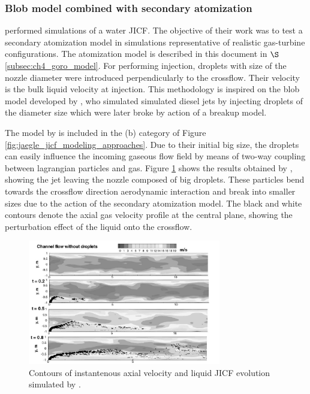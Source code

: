 \newpage

\subsubsection*{Blob model combined with secondary atomization }

 performed simulations of a water JICF. The objective of their work was to test a secondary atomization model in simulations representative of realistic gas-turbine configurations. The atomization model is described in this document in $\S$\ref{subsec:ch4_goro_model}. For performing injection, droplets with size of the nozzle diameter were introduced perpendicularly to the crossflow. Their velocity is the bulk liquid velocity at injection. This methodology is inspired on the blob model developed by , who simulated simulated diesel jets by injecting droplets of the diameter size which were later broke by action of a breakup model. 

The model by  is included in the (b) category of Figure \ref{fig:jaegle_jicf_modeling_approaches}. Due to their initial big size, the droplets can easily influence the incoming gaseous flow field by means of two-way coupling between lagrangian particles and gas. Figure \ref{fig:apte_2003_jicf} shows the results obtained by , showing the jet leaving the nozzle composed of big droplets. These particles bend towards the crossflow direction aerodynamic interaction 
 and break into smaller sizes due to the action of the secondary atomization model. The black and white contours denote the axial gas velocity profile at the central plane, showing the perturbation effect of the liquid onto the crossflow.

\begin{figure}[ht]
    \centering
    \includegraphics[width=0.75\textwidth]{./part1_numerical_approaches/figures_ch3/apte_2003_jicf}
       \centering
    \caption{Contours of instantenous axial velocity and liquid JICF evolution simulated by .}
    \label{fig:apte_2003_jicf}
\end{figure}

